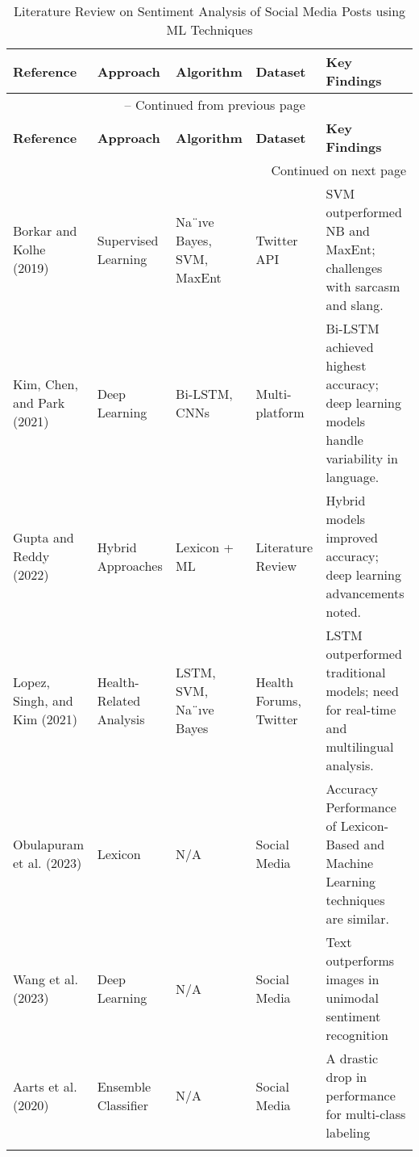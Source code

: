 \documentclass{IEEEtran}
\begin{document}
\begin{longtable}{|p{1.5cm}|p{1.3cm}|p{1.35cm}|p{1.1cm}|p{1.8cm}|}
    
    \hline
    \textbf{Reference} & \textbf{Approach} & \textbf{Algorithm} & \textbf{Dataset} & \textbf{Key Findings} \\
    \hline
    \endfirsthead

    \multicolumn{5}{c}{\tablename\ \thetable{} -- Continued from previous page} \\
    \hline
    \textbf{Reference} & \textbf{Approach} & \textbf{Algorithm} & \textbf{Dataset} & \textbf{Key Findings} \\
    \hline
    \endhead

    \hline \multicolumn{5}{r}{Continued on next page} \\ \endfoot

    \hline
    \endlastfoot

    Borkar and Kolhe (2019) & Supervised Learning & Na¨ıve Bayes, SVM, MaxEnt & Twitter API & SVM outperformed NB and MaxEnt; challenges with sarcasm and slang. \\
    \hline
    Kim, Chen, and Park (2021) & Deep Learning & Bi-LSTM, CNNs & Multi-platform & Bi-LSTM achieved highest accuracy; deep learning models handle variability in language. \\
    \hline
    Gupta and Reddy (2022) & Hybrid Approaches & Lexicon + ML & Literature Review & Hybrid models improved accuracy; deep learning advancements noted. \\
    \hline
    Lopez, Singh, and Kim (2021) & Health-Related Analysis & LSTM, SVM, Na¨ıve Bayes & Health Forums, Twitter & LSTM outperformed traditional models; need for real-time and multilingual analysis. \\
    \hline
    Obulapuram et al. (2023) & Lexicon & N/A & Social Media & Accuracy Performance of Lexicon-Based and Machine Learning techniques are similar. \\
    \hline
    Wang et al. (2023) & Deep Learning & N/A & Social Media & Text outperforms images in unimodal sentiment recognition \\
    \hline
    Aarts et al. (2020) & Ensemble Classifier & N/A & Social Media & A drastic drop in performance for multi-class labeling \\
    \hline
\caption{Literature Review on Sentiment Analysis of Social
Media Posts using ML Techniques} \label{tab:literature_review} \\
\end{longtable}
\end{document}

